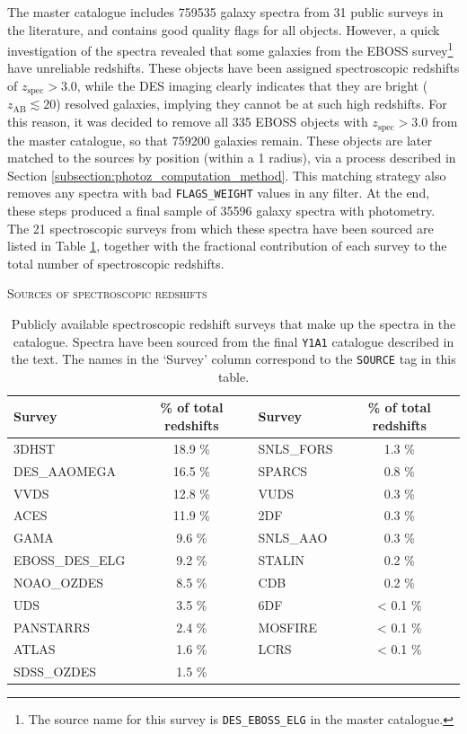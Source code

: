 The master catalogue includes \num{759 535} galaxy spectra from 31 public surveys in the literature, and contains good quality flags for all objects. However, a quick investigation of the spectra revealed that some galaxies from the EBOSS survey\footnote{The source name for this survey is  \texttt{DES\_EBOSS\_ELG} in the master catalogue.} have unreliable redshifts. These objects have been assigned spectroscopic redshifts of $z_{\mathrm{spec}}>3.0$, while the DES imaging clearly indicates that they are bright ($z_{\mathrm{AB}}\lesssim20$) resolved galaxies, implying they cannot be at such high redshifts. For this reason, it was decided to remove all 335 EBOSS objects with $z_{\mathrm{spec}}>3.0$ from the master catalogue, so that \num{759 200} galaxies remain. These objects are later matched to the \DESVIDEO sources by position (within a \SI{1}{\arcsec} radius), via a process described in Section \ref{subsection:photoz_computation_method}. This matching strategy also removes any spectra with bad \texttt{FLAGS\_WEIGHT} values in any \DESVIDEO filter. At the end, these steps produced a final sample of \num{35596} galaxy spectra with \DESVIDEO photometry. The 21 spectroscopic surveys from which these spectra have been sourced are listed in Table \ref{table:spectra}, together with the fractional contribution of each survey to the total number of \DESVIDEO spectroscopic redshifts. \par 


\begin{table}[!htb]
\centering
\textsc{Sources of spectroscopic redshifts} \\
\vspace{0.1em}
\footnotesize
\begin{tabular}{lclc}
\toprule\toprule
Survey  & \% of total redshifts & Survey & \% of total redshifts \\
\midrule
3DHST & 18.9 \% & SNLS\_FORS & 1.3 \% \\
DES\_AAOMEGA & 16.5 \% & SPARCS & 0.8 \% \\
VVDS & 12.8 \% & VUDS & 0.3 \% \\
ACES & 11.9 \% & 2DF & 0.3 \% \\
GAMA & 9.6 \% & SNLS\_AAO & 0.3 \% \\
EBOSS\_DES\_ELG & 9.2 \% &  STALIN & 0.2 \% \\
NOAO\_OZDES & 8.5 \% & CDB & 0.2 \% \\
UDS & 3.5 \% & 6DF & < 0.1 \% \\
PANSTARRS & 2.4 \% & MOSFIRE & < 0.1 \% \\
ATLAS & 1.6 \% & LCRS & < 0.1 \% \\
SDSS\_OZDES & 1.5 \% & & \\

\bottomrule
\end{tabular}
\vspace{1em}
\caption[Spectra and source surveys]{Publicly available spectroscopic redshift surveys that make up the spectra in the \DESVIDEO catalogue. Spectra have been sourced from the final \texttt{Y1A1} catalogue described in the text. The names in the `Survey' column correspond to the \texttt{SOURCE} tag in this table.}
\label{table:spectra}
\end{table}

